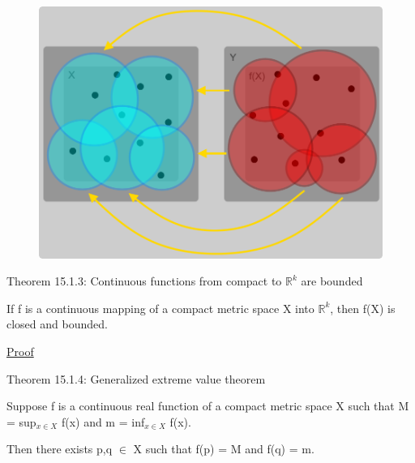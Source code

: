 \begin{figure}[h]
    \centering
	\includegraphics[scale=0.28]{Images/15.1.2.png}
\end{figure}

{ \color{red} Theorem 15.1.3:
Continuous functions from compact to $\mathbb{R}^k$ are bounded }

    \begin{adjustbox}{minipage=14cm, right, vspace=0.1cm 0cm}
        If f is a continuous mapping of a compact metric space X into $\mathbb{R}^k$,
        then f(X) is closed and bounded. 
    \end{adjustbox}

{ \color{magenta} \underline{Proof} }


    \vspace{0.5cm}

{ \color{red} Theorem 15.1.4: Generalized extreme value theorem }

    \begin{adjustbox}{minipage=14cm, right, vspace=0.1cm 0cm}
        Suppose f is a continuous real function of a compact metric space X
        such that M = sup$_{x \in X}$ f(x) and m = inf$_{x \in X}$ f(x).

        Then there exists p,q $\in$ X such that f(p) = M and f(q) = m.
    \end{adjustbox}

